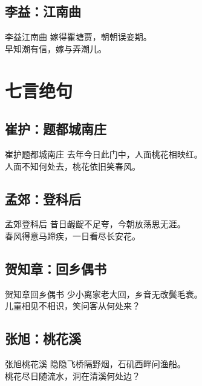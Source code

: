 \documentclass[12pt,oneside,a5paper]{book}
\begin{document}
\chapter{李益：江南曲}
\begin{poemzh}{李益}{江南曲}
嫁得瞿塘贾，朝朝误妾期。\\
早知潮有信，嫁与弄潮儿。\\ 
\end{poemzh}


\part{七言绝句}

\chapter{崔护：题都城南庄}
\begin{poemzh}{崔护}{题都城南庄}
去年今日此门中，人面桃花相映红。\\
人面不知何处去，桃花依旧笑春风。\\
\end{poemzh}

\chapter{孟郊：登科后}
\begin{poemzh}{孟郊}{登科后}
昔日龌龊不足夸，今朝放荡思无涯。\\
春风得意马蹄疾，一日看尽长安花。\\
\end{poemzh}

\chapter{贺知章：回乡偶书}
\begin{poemzh}{贺知章}{回乡偶书}
少小离家老大回，乡音无改鬓毛衰。\\
儿童相见不相识，笑问客从何处来？\\ 
\end{poemzh}

\chapter{张旭：桃花溪}
\begin{poemzh}{张旭}{桃花溪}
隐隐飞桥隔野烟，石矶西畔问渔船。\\
桃花尽日随流水，洞在清溪何处边？\\ 
\end{poemzh}
\end{document}
